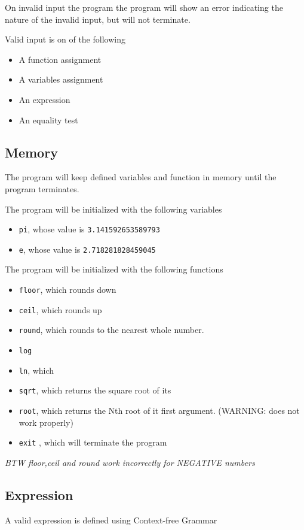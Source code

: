 \documentclass[11pt,a4paper]{article}
\begin{document}
On invalid input the program the program will show an error
indicating the nature of the invalid input, but will not terminate.

Valid input is on of the following
\begin{itemize}
\item A function assignment
\item A variables assignment
\item An expression
\item An equality test
\end{itemize}
\subsection{Memory}
The program will keep defined variables and function in memory
until the program terminates.


The program will be initialized with the following variables
\begin{itemize}
\item \texttt{pi}, whose value is \texttt{3.141592653589793}
\item \texttt{e}, whose value is \texttt{2.718281828459045}
\end{itemize}


The program will be initialized with the following functions
\begin{itemize}
\item \texttt{floor}, which rounds down
\item \texttt{ceil}, which rounds up
\item \texttt{round}, which rounds to the nearest  whole number.
\item \texttt{log}
\item \texttt{ln}, which
\item \texttt{sqrt}, which returns the square root of its
\item \texttt{root}, which returns the Nth root of it first argument.  (WARNING: does not work properly)
\item \texttt{exit} , which will terminate the program
\end{itemize}



\emph{BTW floor,ceil and round work incorrectly for NEGATIVE numbers}
\subsection{Expression}
A valid expression is defined using Context-free Grammar
\end{document}
